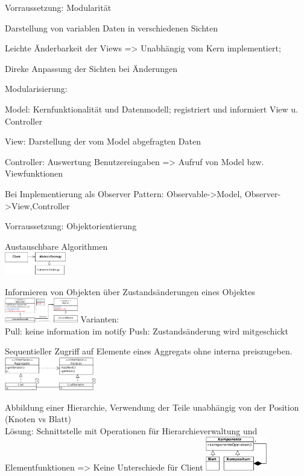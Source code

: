 Vorraussetzung: Modularität

Darstellung von variablen Daten in verschiedenen Sichten

Leichte Änderbarkeit der Views => Unabhängig vom Kern implementiert;

Direke Anpassung der Sichten bei Änderungen

Modularisierung:

Model: Kernfunktionalität und Datenmodell; registriert und informiert View u. Controller

View: Darstellung der vom Model abgefragten Daten

Controller: Auswertung Benutzereingaben => Aufruf von Model bzw. Viewfunktionen

Bei Implementierung als Observer Pattern: Observable->Model, Observer->View,Controller

Vorraussetzung: Objektorientierung

 Austauschbare Algorithmen\\
\includegraphics[width=0.2\textwidth]{strategy}

 Informieren von Objekten über Zustandsänderungen eines Objektes\\
\includegraphics[width=0.24\textwidth]{observer}
Varianten:\\
Pull: keine information im notify
Push: Zustandsänderung wird mitgeschickt

 Sequentieller Zugriff auf Elemente eines Aggregats ohne interna preiszugeben. 
\includegraphics[width=0.3\textwidth]{iterator}

 Abbildung einer Hierarchie, Verwendung der Teile unabhängig von der Position (Knoten vs Blatt)\\
Lösung: Schnittstelle mit Operationen für Hierarchieverwaltung und Elementfunktionen => Keine Unterschiede für Client
\includegraphics[width=0.2\textwidth]{Composite}

